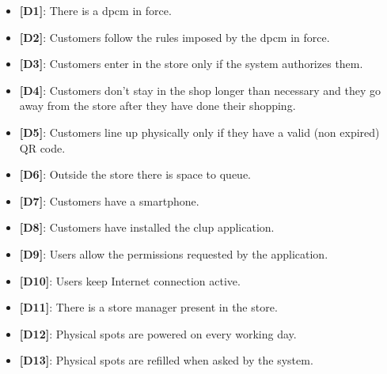 \begin{itemize}

    \item \textbf{{[D1]}}: There is a \gls{dpcm} in force.
    \item \textbf{{[D2]}}: Customers follow the rules imposed by the \gls{dpcm} in force.
    \item \textbf{{[D3]}}: Customers enter in the store only if the system authorizes them.
    \item \textbf{{[D4]}}: Customers don't stay in the shop longer than necessary and they go away from the store after they have done their shopping.
    \item \textbf{{[D5]}}: Customers line up physically only if they have a valid (non expired) QR code.
    \item \textbf{{[D6]}}: Outside the store there is space to queue.
    \item \textbf{{[D7]}}: Customers have a smartphone.
    \item \textbf{{[D8]}}: Customers have installed the \gls{clup} application.
    \item \textbf{{[D9]}}: Users allow the permissions requested by the application.
    \item \textbf{{[D10]}}: Users keep Internet connection active.
    \item \textbf{{[D11]}}: There is a store manager present in the store.
    \item \textbf{{[D12]}}: Physical spots are powered on every working day.
    \item \textbf{{[D13]}}: Physical spots are refilled when asked by the system.

\end{itemize}